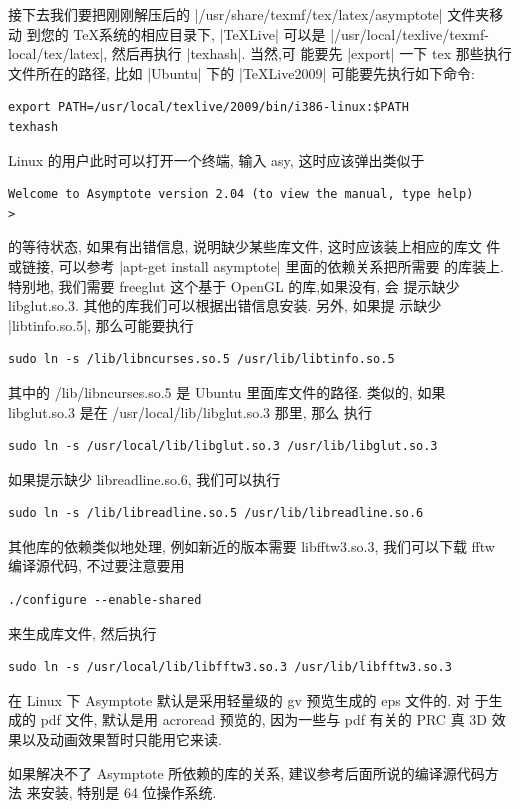 \documentclass[nofonts,CJKnormalspaces]{ctexbook}[2009/05/20]
\begin{document}
接下去我们要把刚刚解压后的 |/usr/share/texmf/tex/latex/asymptote| 文件夹移动
到您的 \TeX 系统的相应目录下, |TeXLive| 可以是
|/usr/local/texlive/texmf-local/tex/latex|, 然后再执行 |texhash|. 当然,可
能要先 |export| 一下 tex 那些执行文件所在的路径, 比如 |Ubuntu| 下的
|TeXLive2009| 可能要先执行如下命令:
\begin{verbatim}
export PATH=/usr/local/texlive/2009/bin/i386-linux:$PATH
texhash
\end{verbatim}
Linux 的用户此时可以打开一个终端, 输入 asy, 这时应该弹出类似于
\begin{verbatim}
Welcome to Asymptote version 2.04 (to view the manual, type help)
>
\end{verbatim}
的等待状态, 如果有出错信息, 说明缺少某些库文件, 这时应该装上相应的库文
件或链接, 可以参考 |apt-get install asymptote| 里面的依赖关系把所需要
的库装上. 特别地, 我们需要 freeglut 这个基于 OpenGL 的库,如果没有, 会
提示缺少 libglut.so.3. 其他的库我们可以根据出错信息安装. 另外, 如果提
示缺少 |libtinfo.so.5|, 那么可能要执行
\begin{verbatim}
sudo ln -s /lib/libncurses.so.5 /usr/lib/libtinfo.so.5
\end{verbatim}
其中的 /lib/libncurses.so.5 是 Ubuntu 里面库文件的路径.
类似的, 如果 libglut.so.3 是在 /usr/local/lib/libglut.so.3 那里, 那么
执行
\begin{verbatim}
sudo ln -s /usr/local/lib/libglut.so.3 /usr/lib/libglut.so.3
\end{verbatim}
如果提示缺少 libreadline.so.6, 我们可以执行
\begin{verbatim}
sudo ln -s /lib/libreadline.so.5 /usr/lib/libreadline.so.6
\end{verbatim}
其他库的依赖类似地处理, 例如新近的版本需要 libfftw3.so.3, 我们可以下载
fftw 编译源代码, 不过要注意要用
\begin{verbatim}
./configure --enable-shared
\end{verbatim}
来生成库文件, 然后执行
\begin{verbatim}
sudo ln -s /usr/local/lib/libfftw3.so.3 /usr/lib/libfftw3.so.3
\end{verbatim}

在 Linux 下 Asymptote 默认是采用轻量级的 gv 预览生成的 eps 文件的. 对
于生成的 pdf 文件, 默认是用 acroread 预览的, 因为一些与 pdf 有关的 PRC
真 3D 效果以及动画效果暂时只能用它来读.

如果解决不了 Asymptote 所依赖的库的关系, 建议参考后面所说的编译源代码方法
来安装, 特别是 64 位操作系统.
\end{document}
